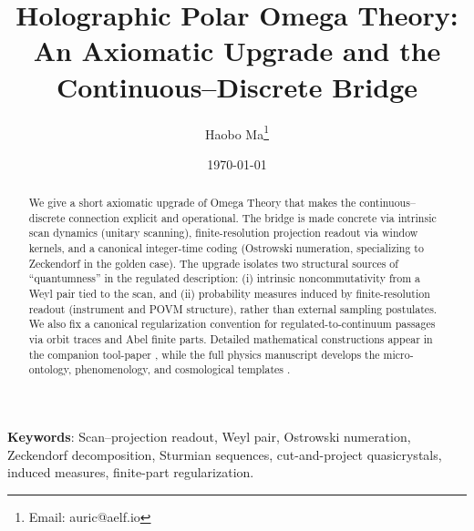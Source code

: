 \documentclass[11pt,a4paper]{article}
\title{Holographic Polar Omega Theory: An Axiomatic Upgrade and the Continuous--Discrete Bridge}
\author{Haobo Ma\thanks{Email: auric@aelf.io}}
\date{\today}
\begin{document}
\maketitle

\begin{abstract}
We give a short axiomatic upgrade of Omega Theory that makes the continuous--discrete connection explicit and operational. The bridge is made concrete via intrinsic scan dynamics (unitary scanning), finite-resolution projection readout via window kernels, and a canonical integer-time coding (Ostrowski numeration, specializing to Zeckendorf in the golden case). The upgrade isolates two structural sources of ``quantumness'' in the regulated description: (i) intrinsic noncommutativity from a Weyl pair tied to the scan, and (ii) probability measures induced by finite-resolution readout (instrument and POVM structure), rather than external sampling postulates. We also fix a canonical regularization convention for regulated-to-continuum passages via orbit traces and Abel finite parts. Detailed mathematical constructions appear in the companion tool-paper \cite{Ma2025HPA}, while the full physics manuscript develops the micro-ontology, phenomenology, and cosmological templates \cite{Ma2025FoP}.
\end{abstract}

\textbf{Keywords}: Scan--projection readout, Weyl pair, Ostrowski numeration, Zeckendorf decomposition, Sturmian sequences, cut-and-project quasicrystals, induced measures, finite-part regularization.

\tableofcontents
\newpage








\end{document}
